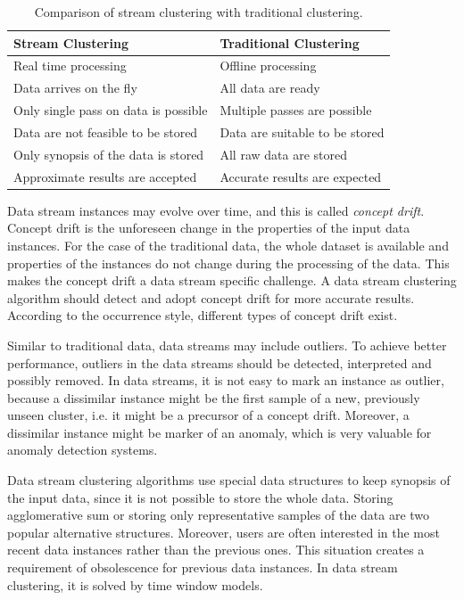 \documentclass[smallcondensed]{svjour3}     %
\begin{document}
\begin{table}[htbp]
\caption{Comparison of stream clustering with traditional clustering.}
\begin{center}
\begin{tabular}{l l}
	\textbf{Stream Clustering} 			& \textbf{Traditional Clustering} \\
	\hline
	Real time processing 		& Offline processing \\
	Data arrives on the fly 	& All data are ready \\
	Only single pass on data is possible & Multiple passes are possible \\
	Data are not feasible to be stored	& Data are suitable to be stored \\
	Only synopsis of the data is stored & All raw data are stored \\
	Approximate results are accepted	& Accurate results are expected \\	
	\hline
\end{tabular}
\label{tbl:streamVsTraditional}
\end{center}
\end{table}


Data stream instances may evolve over time, and this is called \textit{concept drift}. Concept drift is the unforeseen change in the properties of the input data instances. For the case of the traditional data, the whole dataset is available and properties of the instances do not change during the processing of the data. This makes the concept drift a data stream specific challenge. A data stream clustering algorithm should detect and adopt concept drift for more accurate results. According to the occurrence style, different types of concept drift exist. 

Similar to traditional data, data streams may include outliers. To achieve better performance, outliers in the data streams should be detected, interpreted and possibly removed. In data streams, it is not easy to mark an instance as outlier, because a dissimilar instance might be the first sample of a new, previously unseen cluster, i.e. it might be a precursor of a concept drift. Moreover, a dissimilar instance might be marker of an anomaly, which is very valuable for anomaly detection systems. 

Data stream clustering algorithms use special data structures to keep synopsis of the input data, since it is not possible to store the whole data. Storing agglomerative sum or storing only representative samples of the data are two popular alternative structures. Moreover, users are often interested in the most recent data instances rather than the previous ones. This situation creates a requirement of obsolescence for previous data instances. In data stream clustering, it is solved by time window models.
\end{document}
